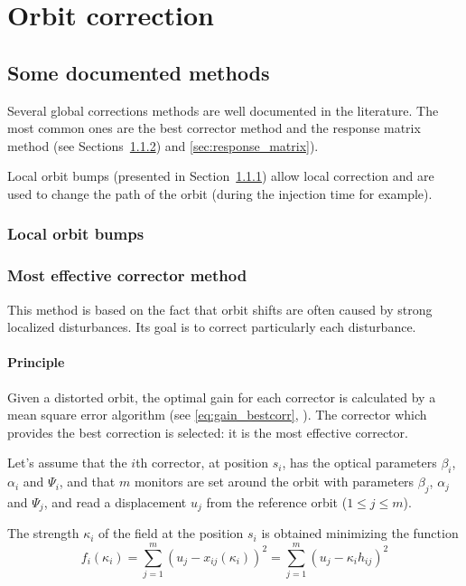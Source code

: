 
\chapter{Orbit correction}
\label{sec:correction}
\section{Some documented methods}

Several global corrections methods are well documented in the literature. The most common ones are the best corrector method and the response matrix method (see Sections~\ref{sec:most_effective_corr}) and \ref{sec:response_matrix}). 

Local orbit bumps (presented in Section~\ref{sec:orbit_bump}) allow local correction and are used to change the path of the orbit (during the injection time for example).

\subsection{Local orbit bumps}
\label{sec:orbit_bump}

\subsection{Most effective corrector method}
\label{sec:most_effective_corr}
This method is based on the fact that orbit shifts are often caused by strong localized disturbances. Its goal is to correct particularly each disturbance.

\subsubsection{Principle}

Given a distorted orbit, the optimal gain for each corrector is calculated by a mean square error algorithm (see \eqref{eq:gain_bestcorr}, \cite{book:wille}). The corrector which provides the best correction is selected: it is the most effective corrector.

Let's assume that the $i$th corrector, at position $s_i$, has the optical parameters $\beta_i$, $\alpha_i$ and $\Psi_i$, and that $m$ monitors are set around the orbit with parameters $\beta_j$, $\alpha_j$ and $\Psi_j$, and read a displacement $u_j$ from the reference orbit ($1 \leq j \leq m$).

The strength $\kappa_i$ of the field at the position $s_i$ is obtained minimizing the function
\begin{equation}
    \label{eq:gain_bestcorr}
    f_i(\kappa_i) = \sum\limits_{j=1}^{m} (u_j-x_{ij}(\kappa_i))^2 
                  = \sum\limits_{j=1}^{m} (u_j- \kappa_i h_{ij})^2
\end{equation}

